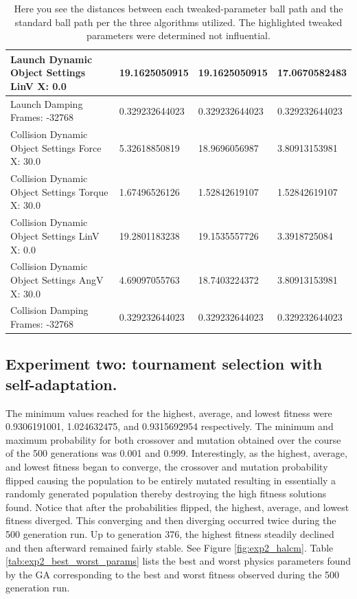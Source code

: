 \begin{table}[htbp]
\begin{tabular}{ | l || l | l | l | }
Launch Dynamic Object Settings LinV X: 0.0 & 19.1625050915  & 19.1625050915  & 17.0670582483 \\ \hline
\rowcolor{cyan}
Launch Damping Frames: -32768 & 0.329232644023 & 0.329232644023  & 0.329232644023 \\ \hline
Collision Dynamic Object Settings Force X: 30.0 & 5.32618850819  & 18.9696056987  & 3.80913153981 \\ \hline
Collision Dynamic Object Settings Torque X: 30.0 & 1.67496526126  & 1.52842619107  & 1.52842619107 \\ \hline
Collision Dynamic Object Settings LinV X: 0.0 & 19.2801183238  & 19.1535557726  & 3.3918725084 \\ \hline
Collision Dynamic Object Settings AngV X: 30.0 & 4.69097055763 & 18.7403224372 & 3.80913153981 \\ \hline
\rowcolor{cyan}
Collision Damping Frames: -32768 & 0.329232644023 & 0.329232644023 & 0.329232644023 \\ \hline
\end{tabular}
\caption[Physics Engine Parameter Influences]{Here you see the distances between each tweaked-parameter ball path and the standard ball path per the three algorithms utilized. The highlighted tweaked parameters were determined not influential.}
\label{tab:distances}
\end{table}

\newpage

\subsection[Experiment Two]{Experiment two: tournament selection with self-adaptation.}

The minimum values reached for the highest, average, and lowest fitness were 0.9306191001, 1.024632475, and 0.9315692954 respectively. The minimum and maximum probability for both crossover and mutation obtained over the course of the 500 generations was 0.001 and 0.999. Interestingly, as the highest, average, and lowest fitness began to converge, the crossover and mutation probability flipped causing the population to be entirely mutated resulting in essentially a randomly generated population thereby destroying the high fitness solutions found. Notice that after the probabilities flipped, the highest, average, and lowest fitness diverged. This converging and then diverging occurred twice during the 500 generation run. Up to generation 376, the highest fitness steadily declined and then afterward remained fairly stable. See Figure \ref{fig:exp2_halcm}. Table \ref{tab:exp2_best_worst_params} lists the best and worst physics parameters found by the GA corresponding to the best and worst fitness observed during the 500 generation run.

